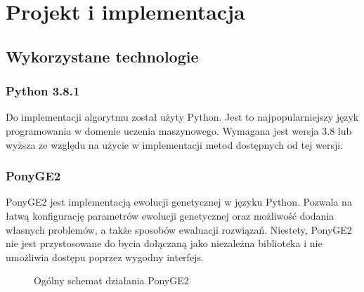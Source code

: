 \chapter{Projekt i implementacja}

\section{Wykorzystane technologie}
\subsection{Python 3.8.1}
Do implementacji algorytmu został użyty Python. Jest to najpopularniejszy język programowania w domenie uczenia maszynowego. Wymagana jest wersja 3.8 lub wyższa ze względu na użycie w implementacji metod dostępnych od tej wersji.  
\subsection{PonyGE2}
PonyGE2 \cite{Fenton_2017} jest implementacją ewolucji genetycznej w języku Python. Pozwala na łatwą konfigurację parametrów ewolucji genetycznej oraz możliwość dodania własnych problemów, a także sposobów ewaluacji rozwiązań. Niestety, PonyGE2 nie jest przystosowane do bycia dołączaną jako niezależna biblioteka i nie umożliwia dostępu poprzez wygodny interfejs.

\begin{figure}[h]
	\caption{\label{fig:PonyGE2-search-loop}Ogólny schemat działania PonyGE2}
\end{figure}

